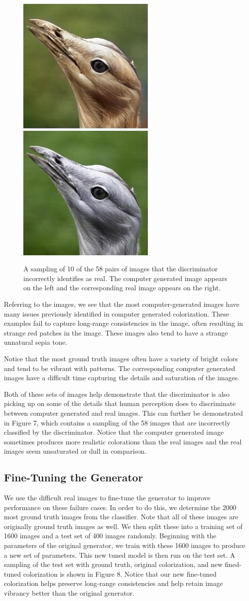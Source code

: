 \documentclass[10pt,twocolumn,letterpaper]{article}
\begin{document}
\begin{figure}[htp]
\includegraphics[width=.10\textwidth]{analysis/incorrect_classification/cr/49479.png} 
\includegraphics[width=.10\textwidth]{analysis/incorrect_classification/gt/49479.png}   \\
\caption{A sampling of 10 of the 58 pairs of images that the discriminator incorrectly identifies as real. The computer generated image appears on the left and the corresponding real image appears on the right.}

\end{figure}


Referring to the images, we see that the most computer-generated images have many issues previously identified in computer generated colorization. These examples fail to capture long-range consistencies in the image, often resulting in strange red patches in the image. These images also tend to have a strange unnatural sepia tone.

Notice that the most ground truth images often have a variety of bright colors and tend to be vibrant with patterns. The corresponding computer generated images have a difficult time capturing the details and saturation of the images. 

Both of these sets of images help demonstrate that the discriminator is also picking up on some of the details that human perception does to discriminate between computer generated and real images. This can further be demonstrated in Figure 7, which contains a sampling of the 58 images that are incorrectly classified by the discriminator. Notice that the computer generated image sometimes produces more realistic colorations than the real images and the real images seem unsaturated or dull in comparison. 

\subsection{Fine-Tuning the Generator}

We use the difficult real images to fine-tune the generator to improve performance on these failure cases. In order to do this, we determine the 2000 most ground truth images from the classifier. Note that all of these images are originally ground truth images as well. We then split these into a training set of 1600 images and a test set of 400 images randomly. Beginning with the parameters of the original generator, we train with these 1600 images to produce a new set of parameters. This new tuned model is then run on the test set. A sampling of the test set with ground truth, original colorization, and new fined-tuned colorization is shown in Figure 8. Notice that our new fine-tuned colorization helps preserve long-range consistencies and help retain image vibrancy better than the original generator. 
\end{document}
